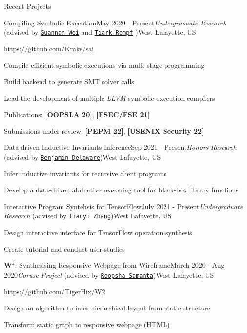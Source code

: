 \documentclass{resume} %
\begin{document}
\begin{rSection}{Recent Projects}

\begin{rSubsection}{Compiling Symbolic Execution}{May 2020 - Present}{\textit{Undergraduate Research} (advised by \href{http://continuation.passing.style/}{\texttt{Guannan Wei}} and \href{http://tiarkrompf.github.io/}{\texttt{Tiark Rompf}} )}{West Lafayette, US}
\item \url{https://github.com/Kraks/sai}
\item Compile efficient symbolic executions via multi-stage programming
\item Build backend to generate SMT solver calls
\item Lead the development of multiple \textit{LLVM} symbolic execution compilers
\item Publications: \textbf{[OOPSLA 20]}, \textbf{[ESEC/FSE 21]}
\item Submissions under review: \textbf{[PEPM 22]}, \textbf{[USENIX Security 22]}
\end{rSubsection}

\begin{rSubsection}{Data-driven Inductive Invariants Inference}{Sep 2021 - Present}{\textit{Honors Research} (advised by \href{https://www.cs.purdue.edu/homes/bendy/}{\texttt{Benjamin Delaware}})}{West Lafayette, US}
    \item Infer inductive invariants for recursive client programs
    \item Develop a data-driven abductive reasoning tool for black-box library functions
\end{rSubsection}

\begin{rSubsection}{Interactive Program Syntehsis for TensorFlow}{July 2021 - Present}{\textit{Undergraduate Research} (advised by \href{https://tianyi-zhang.github.io/}{\texttt{Tianyi Zhang}})}{West Lafayette, US}
    \item Design interactive interface for TensorFlow operation synthesis
    \item Create tutorial and conduct user-studies
\end{rSubsection}

\begin{rSubsection}{$\mathbf{W}^2$: Synthesising Responsive Webpage from Wireframe}{March 2020 - Aug 2020}{\textit{Coruse Project} (advised by \href{https://www.cs.purdue.edu/homes/roopsha/}{\texttt{Roopsha Samanta}})}{West Lafayette, US}
\item \url{https://github.com/TigerHix/W2}
\item Design an algorithm to infer hierarchical layout from static structure
\item Transform static graph to responsive webpage (HTML)
\end{rSubsection}


\end{rSection}
\end{document}
